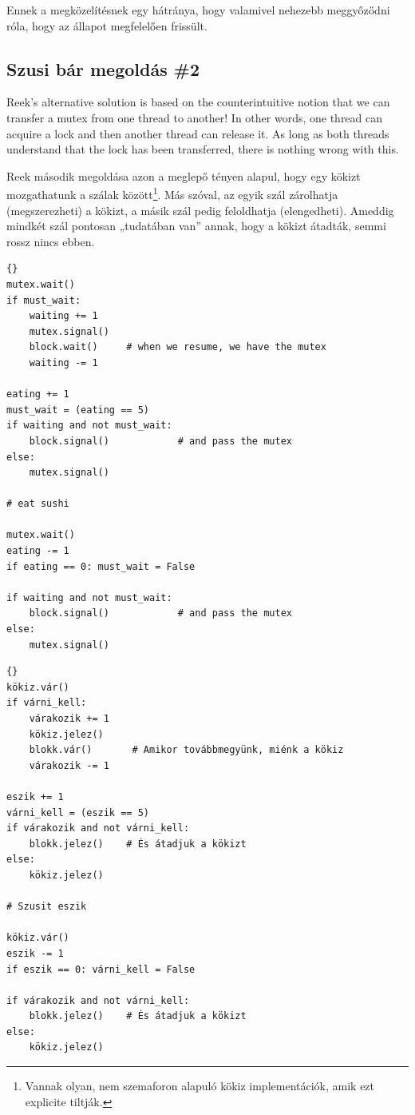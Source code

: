 \documentclass{book}
\newcommand{\clearemptydoublepage}{\newpage\cleardoublepage}
\begin{document}
Ennek a megközelítésnek egy hátránya, hogy valamivel nehezebb
meggyőződni róla, hogy az állapot megfelelően frissült.

\clearemptydoublepage
\subsection{Szusi bár megoldás \#2}

Reek's alternative solution is based on the counterintuitive
notion that we can transfer a mutex from one thread to another!
In other words, one thread can acquire a lock and then another
thread can release it.  As long as both threads understand
that the lock has been transferred, there is nothing wrong with
this.

Reek második megoldása azon a meglepő tényen alapul, hogy
egy kökizt mozgathatunk a szálak között\footnote{Vannak olyan, nem szemaforon
alapuló kökiz implementációk, amik ezt explicite tiltják.}.
Más szóval, az egyik szál zárolhatja (megszerezheti) a kökizt,
a másik szál pedig feloldhatja (elengedheti). Ameddig mindkét szál
pontosan „tudatában van” annak, hogy a kökizt átadták,
semmi rossz nincs ebben.
 
\begin{lstlisting}[title={Sushi bar solution \#2}]{}
mutex.wait()
if must_wait:
    waiting += 1
    mutex.signal()
    block.wait()     # when we resume, we have the mutex
    waiting -= 1

eating += 1
must_wait = (eating == 5)
if waiting and not must_wait:
    block.signal()            # and pass the mutex
else:
    mutex.signal()

# eat sushi

mutex.wait()
eating -= 1
if eating == 0: must_wait = False

if waiting and not must_wait:
    block.signal()            # and pass the mutex
else:
    mutex.signal()
\end{lstlisting}

\begin{lstlisting}[title={Szusi bár megoldás \#2}]{}
kökiz.vár()
if várni_kell:
    várakozik += 1
    kökiz.jelez()
    blokk.vár()       # Amikor továbbmegyünk, miénk a kökiz
    várakozik -= 1

eszik += 1
várni_kell = (eszik == 5)
if várakozik and not várni_kell:
    blokk.jelez()    # És átadjuk a kökizt
else:
    kökiz.jelez()

# Szusit eszik

kökiz.vár()
eszik -= 1
if eszik == 0: várni_kell = False

if várakozik and not várni_kell:
    blokk.jelez()    # És átadjuk a kökizt
else:
    kökiz.jelez()
\end{lstlisting}
\end{document}
